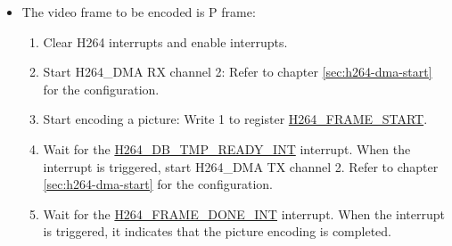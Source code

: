 \documentclass[main\_\_EN.tex]{subfiles}
\begin{document}
\begin{enumerate}
\begin{itemize}
\begin{enumerate}
            \item Wait for the \hyperref[int:H264RECREADYINT]{H264\_REC\_READY\_INT} interrupt. When the interrupt is triggered, start H264\_DMA RX channel 5, H264\_DMA TX channel 3, and TX channel 4. Refer to section \ref{sec:h264-dma-start} for the configuration.
            \item Start H264\_DMA to move the reference picture from external memory to internal memory: Write 1 to register \hyperref[fielddesc:H264DMAMOVESTART]{H264\_DMA\_MOVE\_START}.
            \item Wait for the \hyperref[int:H264DMAMOVE2MBLINEDONEINT]{H264\_DMA\_MOVE\_2MB\_LINE\_DONE\_INT} interrupt. When the interrupt is triggered, start H264\_DMA TX channel 1. Refer to chapter \ref{sec:h264-dma-start} for the configuration.
            \item Wait for the \hyperref[int:H264FRAMEDONEINT]{H264\_FRAME\_DONE\_INT} interrupt. When the interrupt is triggered, it indicates that the picture encoding is completed.
            \item Reset H264\_DMA TX channel 2 and RX channel 2: Refer to chapter \ref{sec:h264-dma-reset} for the configuration.
            \item Reset the read and write time counter of the deblocking filter intermediate data in H264\_DMA: Set register \hyperref[fielddesc:H264DMARXCH2INTERCOUNTERRST]{H264\_DMA\_RX\_CH2\_INTER\_COUNTER\_RST} to 1, then set to 0.
        \end{enumerate}
        \item The video frame to be encoded is P frame:
        \begin{enumerate}
            \item Clear H264 interrupts and enable interrupts.
            \item Start H264\_DMA RX channel 2: Refer to chapter \ref{sec:h264-dma-start} for the configuration.
            \item Start encoding a picture: Write 1 to register \hyperref[fielddesc:H264FRAMESTART]{H264\_FRAME\_START}.
            \item Wait for the \hyperref[int:H264DBTMPREADYINT]{H264\_DB\_TMP\_READY\_INT} interrupt. When the interrupt is triggered, start H264\_DMA TX channel 2. Refer to chapter \ref{sec:h264-dma-start} for the configuration.
            \item Wait for the \hyperref[int:H264FRAMEDONEINT]{H264\_FRAME\_DONE\_INT} interrupt. When the interrupt is triggered, it indicates that the picture encoding is completed.

\end{enumerate}
\end{itemize}
\end{enumerate}
\end{document}
